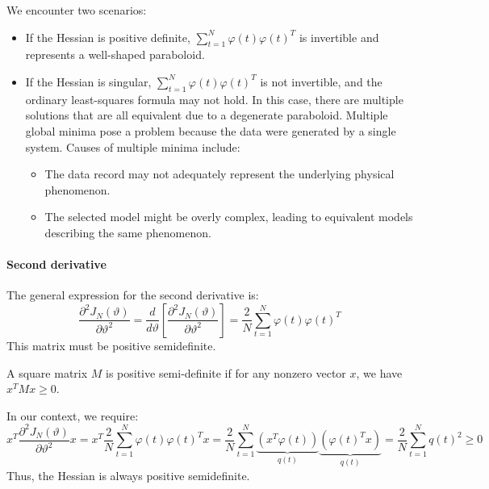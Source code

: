 We encounter two scenarios:
\begin{itemize}
    \item If the Hessian is positive definite, $\sum_{t=1}^{N} \varphi(t)\varphi(t)^T$ is invertible and represents a well-shaped paraboloid.
    \item If the Hessian is singular, $\sum_{t=1} ^{N} \varphi(t)\varphi(t)^T$ is not invertible, and the ordinary least-squares formula may not hold.
        In this case, there are multiple solutions that are all equivalent due to a degenerate paraboloid. 
        Multiple global minima pose a problem because the data were generated by a single system. 
        Causes of multiple minima include:
        \begin{itemize}
            \item The data record may not adequately represent the underlying physical phenomenon.
            \item The selected model might be overly complex, leading to equivalent models describing the same phenomenon.
        \end{itemize}
\end{itemize}

\paragraph*{Second derivative}
The general expression for the second derivative is:
\[\frac{\partial^2 J_N(\vartheta)}{\partial\vartheta^2}=\dfrac{d}{d\vartheta}\left[\frac{\partial^2 J_N(\vartheta)}{\partial\vartheta^2}\right]=\dfrac{2}{N}\sum_{t=1} ^{N} \varphi(t)\varphi(t)^T\]
This matrix must be positive semidefinite.

\begin{definition}
    A square matrix $M$ is positive semi-definite if for any nonzero vector $x$, we have $x^TMx \geq 0$.
\end{definition}
In our context, we require:
\[x^T\frac{\partial^2 J_N(\vartheta)}{\partial\vartheta^2}x=x^T\dfrac{2}{N}\sum_{t=1} ^{N} \varphi(t)\varphi(t)^T x=\dfrac{2}{N}\sum_{t=1} ^{N} \underbrace{\left(x^T\varphi(t)\right)}_{q(t)}  \underbrace{\left(\varphi(t)^Tx\right)}_{q(t)}=\dfrac{2}{N}\sum_{t=1}^{N} q(t)^2 \geq 0\]
Thus, the Hessian is always positive semidefinite.